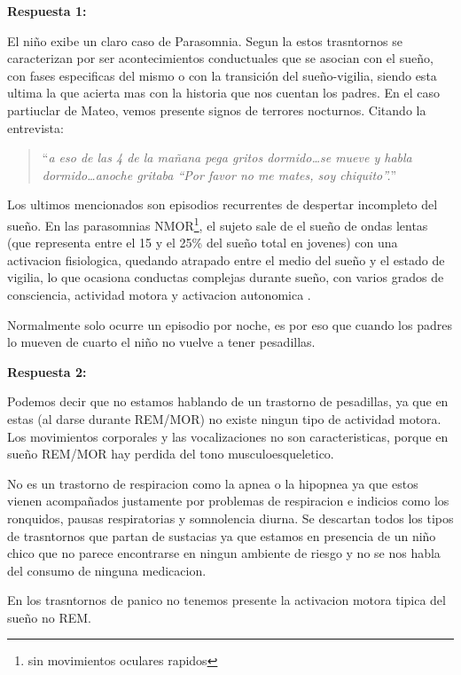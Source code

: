 \documentclass[12pt,a4paper]{article}
\begin{document}
\vspace{1cm}

\textbf{Respuesta 1:}

El niño exibe un claro caso de Parasomnia. Segun la \textcite[p.399]{dsm} estos trasntornos se caracterizan por ser acontecimientos conductuales que se asocian con el sueño, con fases especificas del mismo o con la transición del sueño-vigilia, siendo esta ultima la que acierta mas con la historia que nos cuentan los padres. En el caso partiuclar de Mateo, vemos presente signos de terrores nocturnos. Citando la entrevista:
\begin{quote}
    \enquote{\textit{a eso de las 4 de la mañana pega gritos dormido\ldots se mueve y habla dormido\ldots anoche gritaba ``Por favor no me mates, soy chiquito''.}} 
\end{quote}

Los ultimos mencionados son episodios recurrentes de despertar incompleto del sueño. En las parasomnias NMOR\footnote{sin movimientos oculares rapidos}, el sujeto sale de el sueño de ondas lentas (que representa entre el 15 y el 25\% del sueño total en jovenes) con una activacion fisiologica, quedando atrapado entre el medio del sueño y el estado de vigilia, lo que ocasiona conductas complejas durante sueño, con varios grados de consciencia, actividad motora y activacion autonomica \parencite{dsm}.

Normalmente solo ocurre un episodio por noche, es por eso que cuando los padres lo mueven de cuarto el niño no vuelve a tener pesadillas. 

\textbf{Respuesta 2:}

Podemos decir que no estamos hablando de un trastorno de pesadillas, ya que en estas (al darse durante REM/MOR) no existe ningun tipo de actividad motora. Los movimientos corporales y las vocalizaciones no son caracteristicas, porque en sueño REM/MOR hay perdida del tono musculoesqueletico. 

No es un trastorno de respiracion como la apnea o la hipopnea ya que estos vienen acompañados justamente por problemas de respiracion e indicios como los ronquidos, pausas respiratorias y somnolencia diurna. 
Se descartan todos los tipos de trasntornos que partan de sustacias ya que estamos en presencia de un niño chico que no parece encontrarse en ningun ambiente de riesgo y no se nos habla del consumo de ninguna medicacion. 

En los trasntornos de panico no tenemos presente la activacion motora tipica del sueño no REM. 
\end{document}
